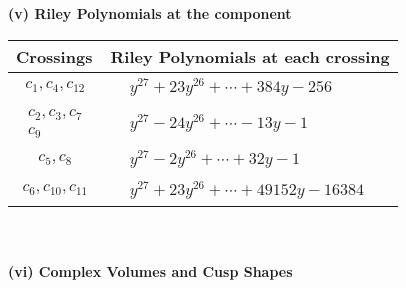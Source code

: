 \documentclass[1p]{elsarticle_modified}
\theoremstyle{definition}
\begin{document}
\newpage\renewcommand{\arraystretch}{1}
\flushleft \textbf{(v) Riley Polynomials at the component}\newline \\
\begin{tabular}{m{50pt}|m{274pt}}
Crossings & \hspace{64pt}Riley Polynomials at each crossing \\
\hline $$\begin{aligned}c_{1},c_{4},c_{12}\end{aligned}$$&$\begin{aligned}
&y^{27}+23 y^{26}+\cdots+384 y-256
\end{aligned}$\\
\hline $$\begin{aligned}c_{2},c_{3},c_{7}\\c_{9}\end{aligned}$$&$\begin{aligned}
&y^{27}-24 y^{26}+\cdots-13 y-1
\end{aligned}$\\
\hline $$\begin{aligned}c_{5},c_{8}\end{aligned}$$&$\begin{aligned}
&y^{27}-2 y^{26}+\cdots+32 y-1
\end{aligned}$\\
\hline $$\begin{aligned}c_{6},c_{10},c_{11}\end{aligned}$$&$\begin{aligned}
&y^{27}+23 y^{26}+\cdots+49152 y-16384
\end{aligned}$\\
\hline
\end{tabular}\\~\\
\newpage\flushleft \textbf{(vi) Complex Volumes and Cusp Shapes}
\end{document}
